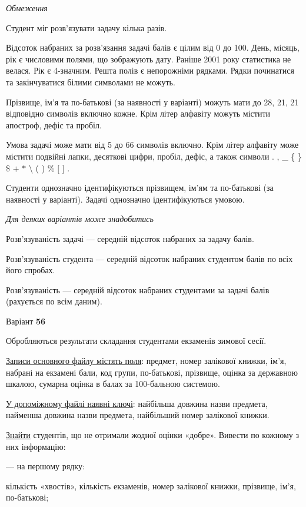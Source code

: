 \documentclass[11pt, ukrainian]{article}
\begin{document}

\bigskip\textit{Обмеження}

Студент міг розв’язувати задачу кілька разів.

Відсоток набраних за розв’язання задачі балів є цілим від 0 до 100.
День, місяць, рік є числовими полями, що зображують дату.
Раніше 2001 року статистика не велася. Рік є 4-значним.
Решта полів є непорожніми рядками.
Рядки починатися та закінчуватися білими символами не можуть.

Прізвище, ім’я та по-батькові (за наявності у варіанті) можуть мати до 28, 21, 21 відповідно символів включно кожне. 
Крім літер алфавіту можуть містити апостроф, дефіс та пробіл.

Умова задачі може мати від 5 до 66 символів включно.
Крім літер алфавіту може містити подвійні лапки, десяткові цифри, пробіл, дефіс,
а також символи . , \_ \{ \} \$ $+$ $*$ {\textbackslash} ( ) \% $[$ $]$ .

Студенти однозначно ідентифікуються прізвищем, ім’ям та по-батькові (за наявності у варіанті).
Задачі однозначно ідентифікуються умовою.

\bigskip\textit{Для деяких варіантів може знадобитись}

Розв'язуваність задачі --- середній відсоток набраних за задачу балів.

Розв'язуваність студента --- середній відсоток набраних студентом балів по всіх його спробах.

Розв'язуваність --- середній відсоток набраних студентами за задачі балів (рахується по всім даним).




\par
\newpage
{\center Варіант  \No \textbf { 56 }\par}
\bigskip
Обробляються результати складання студентами екзаменів зимової сесії.

\underline{Записи основного файлу містять поля}: предмет, номер залікової книжки, ім’я, набрані на екзамені бали, код групи, по-батькові, прізвище, оцінка за державною шкалою, сумарна оцінка в балах за 100-бальною системою.

\underline{У допоміжному файлі наявні ключі}: найбільша довжина назви предмета, найменша довжина назви предмета, найбільший номер залікової книжки.

\underline{Знайти} студентів, що не отримали жодної оцінки «добре». Вивести по кожному з них інформацію:\par
{\noindent}--- на першому рядку:\par
кількість «хвостів», кількість екзаменів, номер залікової книжки, прізвище, ім’я, по-батькові;
\end{document}
